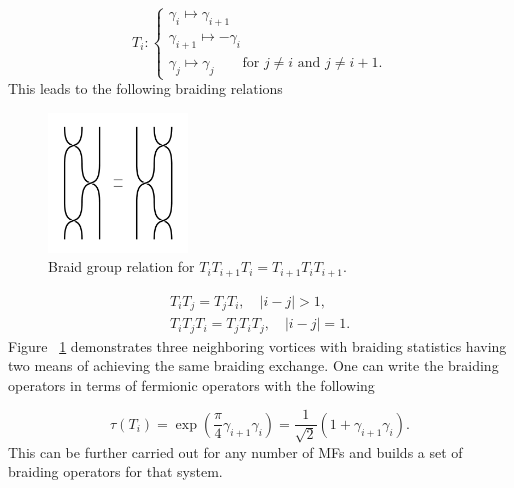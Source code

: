 \begin{equation}
  T_i :
  \begin{cases}
    \gamma_i \mapsto \gamma_{i+1} \\
    \gamma_{i+1} \mapsto -\gamma_i \\
    \gamma_j \mapsto \gamma_j \quad\quad \text{for $j\neq i$ and $j\neq i+1$}.
  \end{cases}
\end{equation}
This leads to the following braiding relations

\begin{figure}
  \includegraphics[width=0.33\textwidth]{./figures/braid.pdf}
  \caption{Braid group relation for $T_i T_{i+1} T_i = T_{i+1} T_i T_{i+1}$.}
  \label{fig:braid}
\end{figure}
\begin{equation}
  \begin{align*}
    T_i T_j = T_j T_i, \quad |i-j| > 1, \\
    T_i T_j T_i = T_j T_i T_j, \quad |i-j| = 1.
  \end{align*}
\end{equation}
Figure ~\ref{fig:braid} demonstrates three neighboring vortices with braiding statistics having two means of achieving the same braiding exchange.
One can write the braiding operators in terms of fermionic operators with the following

\begin{equation}
  \tau(T_i) = \exp\left(\dfrac{\pi}{4} \gamma_{i+1} \gamma_i\right) = \dfrac{1}{\sqrt{2}} \left(1+ \gamma_{i+1} \gamma_i\right).
\end{equation}
This can be further carried out for any number of MFs and builds a set of braiding operators for that system.

